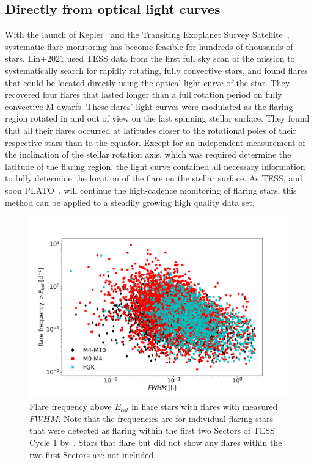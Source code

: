 \documentclass[proof]{WileyASNA-v1}
\begin{document}
\subsection{Directly from optical light curves}
\label{sec:systematic}
With the launch of Kepler~\citep{borucki2010} and the Transiting Exoplanet Survey Satellite~\citep[TESS,][]{ricker2015}, systematic flare monitoring has become feasible for hundreds of thousands of stars. Ilin+2021 used TESS data from the first full sky scan of the mission to systematically search for rapidly rotating, fully convective stars, and found flares that could be located directly using the optical light curve of the star. 
They recovered four flares that lasted longer than a full rotation period on fully convective M dwarfs.
These flares' light curves were modulated as the flaring region rotated in and out of view on the fast spinning stellar surface.
They found that all their flares occurred at latitudes closer to the rotational poles of their respective stars than to the equator.
Except for an independent measurement of the inclination of the stellar rotation axis, which was required determine the latitude of the flaring region, the light curve contained all necessary information to fully determine the location of the flare on the stellar surface.
As TESS, and soon PLATO~\citep{rauer2014}, will continue the high-cadence monitoring of flaring stars, this method can be applied to a steadily growing high quality data set.



\begin{figure}
    \centering
    \includegraphics[width=\hsize]{guenther_repr_fwhm_freq.png}
    \caption{Flare frequency above $E_{bol}$ in flare stars with flares with measured $FWHM$. Note that the frequencies are for individual flaring stars that were detected as flaring within the first two Sectors of TESS Cycle 1 by~\citet{guenther2020}. Stars that flare but did not show any flares within the two first Sectors are not included.}
    \label{fig:guenther}
\end{figure}
\end{document}
